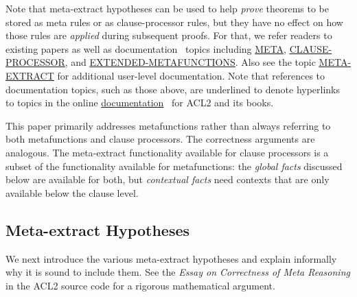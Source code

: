 Note that meta-extract hypotheses can be used to help {\em prove}
theorems to be stored as meta rules or as clause-processor rules, but
they have no effect on how those rules are {\em applied} during
subsequent proofs.  For that, we refer readers to existing papers
\cite{meta-05,trusted-cl-proc} as well as
documentation~\cite{acl2:doc} topics including
\href{http://www.cs.utexas.edu/users/moore/acl2/manuals/current/manual/index.html?topic=ACL2\_\_\_\_META}{\underline{META}},
\href{http://www.cs.utexas.edu/users/moore/acl2/manuals/current/manual/index.html?topic=ACL2\_\_\_\_CLAUSE-PROCESSOR}{\underline{CLAUSE-PROCESSOR}},
and
\href{http://www.cs.utexas.edu/users/moore/acl2/manuals/current/manual/index.html?topic=ACL2\_\_\_\_EXTENDED-METAFUNCTIONS}{\underline{EXTENDED-METAFUNCTIONS}}.
Also see the topic
\href{http://www.cs.utexas.edu/users/moore/acl2/manuals/current/manual/index.html?topic=ACL2\_\_\_\_META-EXTRACT}{\underline{META-EXTRACT}}
for additional user-level documentation.  Note that references to
documentation topics, such as those above, are underlined to denote
hyperlinks to topics in the online
\href{http://www.cs.utexas.edu/users/moore/acl2/manuals/current/manual/index.html}{\underline{documentation}}~\cite{acl2:doc}
for ACL2 and its books.

This paper primarily addresses metafunctions rather than always
referring to both metafunctions and clause processors.  The
correctness arguments are analogous.  The meta-extract functionality
available for clause processors is a subset of the functionality available for
metafunctions: the {\em global facts} discussed below
  are available for both, but {\em contextual facts} need contexts
  that are only available below the clause level.

\subsection{Meta-extract Hypotheses}
\label{sec:intuitive}

We next introduce the various meta-extract hypotheses and
explain informally why it is sound to include them.
See the {\em Essay on Correctness of Meta Reasoning} in
the ACL2 source code for a rigorous mathematical argument.

